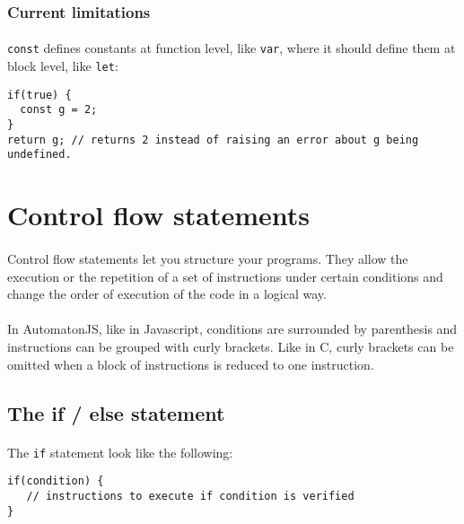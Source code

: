 \documentclass{article}
\begin{document}
\begin{sloppypar}
      
      

\subsubsection{ Current limitations}


\paragraph{}
\lstinline!const! defines constants at function level, like \lstinline!var!, where it should define them at block level, like \lstinline!let!:
{\begin{lstlisting}
if(true) {
  const g = 2;
}
return g; // returns 2 instead of raising an error about g being undefined.
\end{lstlisting}
}

      
   




\section{ Control flow statements}


\paragraph{}
Control flow statements let you structure your programs. They allow the execution or the repetition of a set of instructions under certain conditions and change the order of execution of the code in a logical way.

   
\paragraph{}
In AutomatonJS, like in Javascript, conditions are surrounded by parenthesis and instructions can be grouped with curly brackets.
   Like in C, curly brackets can be omitted when a block of instructions is reduced to one instruction.

   

\subsection{ The if / else statement}


\paragraph{}
The \lstinline!if! statement look like the following:
{\begin{lstlisting}
if(condition) {
   // instructions to execute if condition is verified
}
\end{lstlisting}
}


\end{sloppypar}
\end{document}

